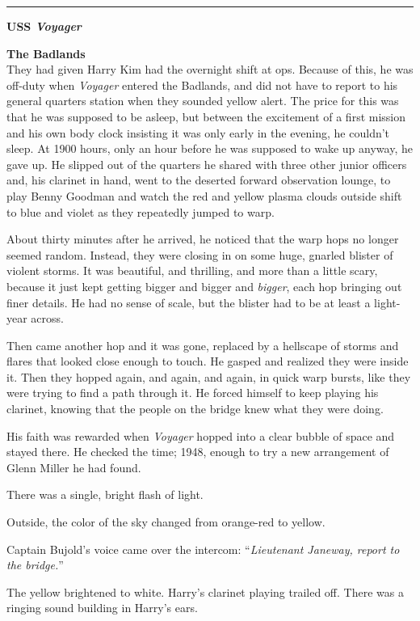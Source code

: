 \documentclass[twoside,letterpaper,12pt]{memoir}
\begin{document}
\fancybreak{\rule{3cm}{0.4 pt}}
\noindent\textbf{USS \textit{Voyager}}

\noindent\textbf{The Badlands}\\

They had given Harry Kim had the overnight shift at ops. Because of this, he was off-duty when \textit{Voyager} entered the Badlands, and did not have to report to his general quarters station when they sounded yellow alert. The price for this was that he was supposed to be asleep, but between the excitement of a first mission and his own body clock insisting it was only early in the evening, he couldn't sleep. At 1900 hours, only an hour before he was supposed to wake up anyway, he gave up. He slipped out of the quarters he shared with three other junior officers and, his clarinet in hand, went to the deserted forward observation lounge, to play Benny Goodman and watch the red and yellow plasma clouds outside shift to blue and violet as they repeatedly jumped to warp.

About thirty minutes after he arrived, he noticed that the warp hops no longer seemed random. Instead, they were closing in on some huge, gnarled blister of violent storms. It was beautiful, and thrilling, and more than a little scary, because it just kept getting bigger and bigger and \textit{bigger}, each hop bringing out finer details. He had no sense of scale, but the blister had to be at least a light-year across.

Then came another hop and it was gone, replaced by a hellscape of storms and flares that looked close enough to touch. He gasped and realized they were inside it. Then they hopped again, and again, and again, in quick warp bursts, like they were trying to find a path through it. He forced himself to keep playing his clarinet, knowing that the people on the bridge knew what they were doing.

His faith was rewarded when \textit{Voyager} hopped into a clear bubble of space and stayed there. He checked the time; 1948, enough to try a new arrangement of Glenn Miller he had found.

There was a single, bright flash of light.

Outside, the color of the sky changed from orange-red to yellow.

Captain Bujold's voice came over the intercom: ``\textit{Lieutenant Janeway, report to the bridge.}''

The yellow brightened to white. Harry’s clarinet playing trailed off. There was a ringing sound building in Harry's ears.
\end{document}
